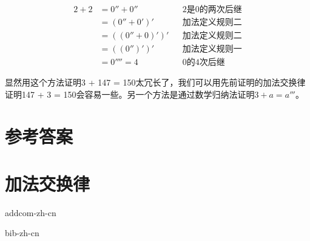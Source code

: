\documentclass[b5paper]{ctexart}
\begin{document}
\begin{Answer}[ref={ex:zero}]
{\begin{align*}
2 + 2 &=  0'' + 0'' && \text{2是0的两次后继} \\
      &=  (0'' + 0')' && \text{加法定义规则二} \\
      &=  ((0'' + 0)')' && \text{加法定义规则二} \\
      &=  ((0'')')' && \text{加法定义规则一} \\
      &=  0'''' = 4 && \text{0的4次后继}
\end{align*}

显然用这个方法证明3 + 147 = 150太冗长了，我们可以用先前证明的加法交换律证明147 + 3 = 150会容易一些。另一个方法是通过数学归纳法证明$3 + a = a'''$。
}
\end{Answer}

\ifx\wholebook\relax \else
\section{参考答案}
\shipoutAnswer

\section{加法交换律}
{addcom-zh-cn}

\begin{thebibliography}{99}
{bib-zh-cn}
\end{thebibliography}

\expandafter\enddocument
\fi
\end{document}
